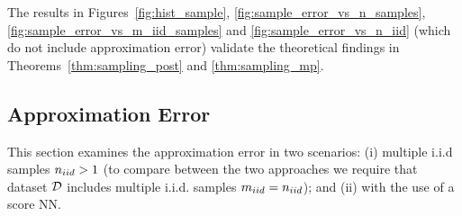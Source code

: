 {The results in Figures~\ref{fig:hist_sample}, \ref{fig:sample_error_vs_n_samples}, \ref{fig:sample_error_vs_m_iid_samples} and  \ref{fig:sample_error_vs_n_iid}
{(which do not include approximation error)} validate the theoretical findings in Theorems~\ref{thm:sampling_post} and \ref{thm:sampling_mp}. 

\subsection{%
{%
Approximation Error}}
%
{This section examines the approximation error in two scenarios: (i) %
{multiple i.i.d samples $n_{iid}>1$ (to compare between the two approaches we require that dataset $\mathcal{D}$ includes multiple i.i.d. samples  $m_{iid}=n_{iid}$); } 
and (ii) with the use of a \pe{} score NN.
}

}

